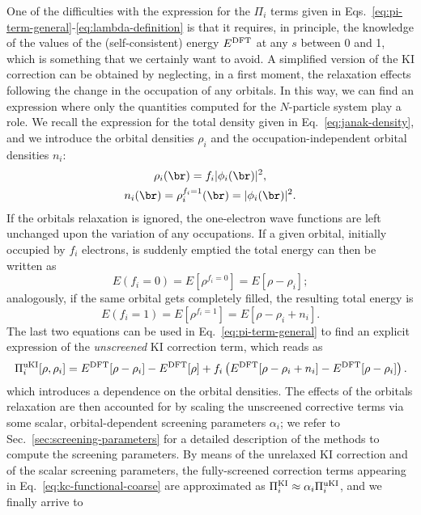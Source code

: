 One of the difficulties with the expression for the $\Pi_i$ terms given in Eqs.~\eqref{eq:pi-term-general}-\eqref{eq:lambda-definition} is that it requires, in principle, the knowledge of the values of the (self-consistent) energy $E^{\rm DFT}$ at any $s$ between 0 and 1, which is something that we certainly want to avoid. A simplified version of the KI correction can be obtained by neglecting, in a first moment, the relaxation effects following the change in the occupation of any orbitals. In this way, we can find an expression where only the quantities computed for the $N$-particle system play a role. We recall the expression for the total density given in Eq.~\eqref{eq:janak-density}, and we introduce the orbital densities $\rho_i$ and the occupation-independent orbital densities $n_i$:
%
\begin{equation}
    \begin{gathered}
    \rho_i(\br) = f_i |\phi_i(\br)|^2 , \\
    n_i(\br) = \rho_i^{f_i=1}(\br) = |\phi_i(\br)|^2 .
    \end{gathered}
    \label{eq:orbital-densities}
\end{equation}
%
If the orbitals relaxation is ignored, the one-electron wave functions are left unchanged upon the variation of any occupations. If a given orbital, initially occupied by $f_i$ electrons, is suddenly emptied the total energy can then be written as
%
\begin{equation}
    E(f_i=0) = E[\rho^{f_i=0}] = E[\rho-\rho_i] ;
    \label{eq:unrelaxed-energy-emptied-orbital}
\end{equation}
%
analogously, if the same orbital gets completely filled, the resulting total energy is
%
\begin{equation}
    E(f_i=1) = E[\rho^{f_i=1}] = E[\rho-\rho_i+n_i] .
    \label{eq:unrelaxed-energy-filled-orbital}
\end{equation}
%
The last two equations can be used in Eq.~\eqref{eq:pi-term-general} to find an explicit expression of the \emph{unscreened} KI correction term, which reads as
%
\begin{equation}
    \Pi_i^{\rm uKI}[\rho,\rho_i] = E^{\rm DFT}[\rho - \rho_i] - E^{\rm DFT}[\rho] + f_i \left( E^{\rm DFT}[\rho - \rho_i + n_i] - E^{\rm DFT}[\rho - \rho_i] \right) .
    \label{eq:ki-correction}
\end{equation}
%
which introduces a dependence on the orbital densities. The effects of the orbitals relaxation are then accounted for by scaling the unscreened corrective terms via some scalar, orbital-dependent screening parameters $\alpha_i$; we refer to Sec.~\ref{sec:screening-parameters} for a detailed description of the methods to compute the screening parameters. By means of the unrelaxed KI correction and of the scalar screening parameters, the fully-screened correction terms appearing in Eq.~\eqref{eq:kc-functional-coarse} are approximated as $\Pi_i^{\rm KI} \approx \alpha_i \Pi_i^{\rm uKI}$, and we finally arrive to \cite{borghi_koopmans-compliant_2014}
